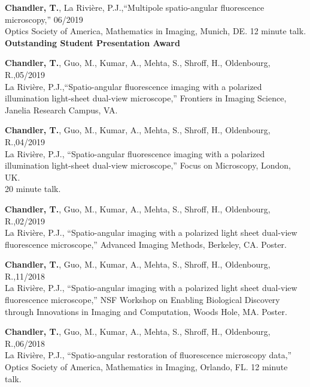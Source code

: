 \documentclass[12pt,letterpaper]{article}
\begin{document}
\begin{benumerate}{8}
\item {\textbf{Chandler, T.}, La Rivi\`ere, P.J.,``Multipole spatio-angular fluorescence microscopy,'' \hfill 06/2019\\ Optics Society of America, Mathematics in Imaging, Munich, DE. 12 minute talk.\\ \textbf{Outstanding Student Presentation Award}}
  
\item {\textbf{Chandler, T.}, Guo, M., Kumar, A., Mehta, S., Shroff, H., Oldenbourg, R.,\hfill 05/2019\\ La Rivi\`ere, P.J.,``Spatio-angular fluorescence imaging with a polarized\\ illumination light-sheet dual-view microscope,'' Frontiers in Imaging Science,\\ Janelia Research Campus, VA.}
  
\item {\textbf{Chandler, T.}, Guo, M., Kumar, A., Mehta, S., Shroff, H., Oldenbourg, R.,\hfill 04/2019\\ La Rivi\`ere, P.J., ``Spatio-angular fluorescence imaging with a polarized\\ illumination light-sheet dual-view microscope,'' Focus on Microscopy, London, UK.\\ 20 minute talk.}
  
\item {\textbf{Chandler, T.}, Guo, M., Kumar, A., Mehta, S., Shroff, H., Oldenbourg, R.,\hfill 02/2019\\ La Rivi\`ere, P.J., ``Spatio-angular imaging with a polarized light sheet dual-view\\ fluorescence microscope,'' Advanced Imaging Methods, Berkeley, CA. Poster.}

\item {\textbf{Chandler, T.}, Guo, M., Kumar, A., Mehta, S., Shroff, H., Oldenbourg, R.,\hfill 11/2018\\ La Rivi\`ere, P.J., ``Spatio-angular imaging with a polarized light sheet dual-view \\ fluorescence microscope,'' NSF Workshop on Enabling Biological Discovery\\ through Innovations in Imaging and Computation, Woods Hole, MA. Poster.}
  
\item {\textbf{Chandler, T.}, Guo, M., Kumar, A., Mehta, S., Shroff, H., Oldenbourg, R.,\hfill 06/2018\\ La Rivi\`ere, P.J., ``Spatio-angular restoration of fluorescence microscopy data,'' \\
      Optics Society of America, Mathematics in Imaging, Orlando, FL. 12 minute talk.}
  

\end{benumerate}
\end{document}
